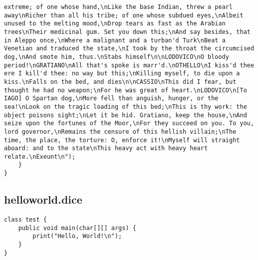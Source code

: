\begin{verbatim}
extreme; of one whose hand,\nLike the base Indian, threw a pearl away\nRicher than all his tribe; of one whose subdued eyes,\nAlbeit unused to the melting mood,\nDrop tears as fast as the Arabian trees\nTheir medicinal gum. Set you down this;\nAnd say besides, that in Aleppo once,\nWhere a malignant and a turban'd Turk\nBeat a Venetian and traduced the state,\nI took by the throat the circumcised dog,\nAnd smote him, thus.\nStabs himself\n\nLODOVICO\nO bloody period!\nGRATIANO\nAll that's spoke is marr'd.\nOTHELLO\nI kiss'd thee ere I kill'd thee: no way but this;\nKilling myself, to die upon a kiss.\nFalls on the bed, and dies\n\nCASSIO\nThis did I fear, but thought he had no weapon;\nFor he was great of heart.\nLODOVICO\n[To IAGO] O Spartan dog,\nMore fell than anguish, hunger, or the sea!\nLook on the tragic loading of this bed;\nThis is thy work: the object poisons sight;\nLet it be hid. Gratiano, keep the house,\nAnd seize upon the fortunes of the Moor,\nFor they succeed on you. To you, lord governor,\nRemains the censure of this hellish villain;\nThe time, the place, the torture: O, enforce it!\nMyself will straight aboard: and to the state\nThis heavy act with heavy heart relate.\nExeunt\n");
	}
}

\end{verbatim}\pagebreak\subsection{helloworld.dice}
\begin{verbatim}
class test {
	public void main(char[][] args) {
		print("Hello, World!\n");
	}
}

\end{verbatim}\pagebreak
